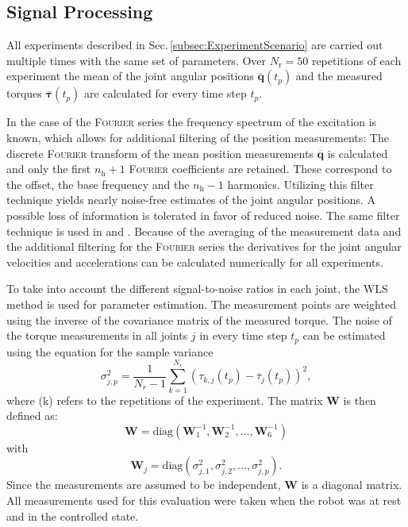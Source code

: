 \subsection{Signal Processing}
\label{subsec:SignalProcessing}
All experiments described in Sec.\,\ref{subsec:ExperimentScenario} are carried out multiple times with the same set of parameters. Over $N_\text{r}=50$ repetitions of each experiment the mean of the joint angular positions $\overline{\boldsymbol{q}}(t_p)$ and the measured torques $\overline{\boldsymbol{\tau}}(t_p)$ are calculated for every time step $t_p$. 

In the case of the \textsc{Fourier} series the frequency spectrum of the excitation is known, which allows for additional filtering of the position measurements: 
The discrete \textsc{Fourier} transform of the mean position measurements $\overline{\boldsymbol{q}}$ is calculated and only the first $n_\mathrm{h}+1$ \textsc{Fourier} coefficients are retained. These correspond to the offset, the base frequency and the $n_\mathrm{h}-1$ harmonics. Utilizing this filter technique yields nearly noise-free estimates of the joint angular positions.
A possible loss of information is tolerated in favor of reduced noise.
The same filter technique is used in \cite{Olsen.2002} and \cite{Stueckelmaier.}. 
Because of the averaging of the measurement data and the additional filtering for the \textsc{Fourier} series the derivatives for the joint angular velocities and accelerations can be calculated numerically for all experiments.


To take into account the different signal-to-noise ratios in each joint, the WLS method is used for parameter estimation. The measurement points are weighted using the inverse of the covariance matrix of the measured torque. The noise of the torque measurements in all joints $j$ in every time step $t_p$ can be estimated using the equation for the sample variance
\begin{equation}\label{eq:var_tau}
	\sigma^2_{j,p} = \frac{1}{N_\textit{r}-1} \sum\limits_{k=1}^{N_\textit{r}} (\tau_{k,j} (t_p) - \overline{\tau}_j(t_p))^2,
\end{equation}
where (k) refers to the repetitions of the experiment.
The matrix $\boldsymbol{W}$ is then defined as:
\begin{equation}\label{eq:WLS_Gew}
	\boldsymbol{W} = \mathrm{diag}(\boldsymbol{W}_1^{-1}, \boldsymbol{W}_2^{-1}, \hdots, \boldsymbol{W}_6^{-1})
\end{equation}
	with
\begin{equation}
	\boldsymbol{W}_j = \mathrm{diag}(\sigma^2_{j,1}, \sigma^2_{j,2}, \hdots, \sigma^2_{j,p}).
\end{equation}
Since the measurements are assumed to be independent, $\boldsymbol{W}$ is a diagonal matrix.
All measurements used for this evaluation were taken when the robot was at rest and in the controlled state.

